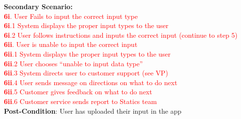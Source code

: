 	\textbf{Secondary Scenario:}\\
	\textcolor{red}{\textbf{6i}. User Fails to input the correct input type}\\
	\textcolor{red}{\hspace{1em} \textbf{6i}.1 System displays the proper input types to the user }\\
	\textcolor{red}{\hspace{1em} \textbf{6i}.2 User follows instructions and inputs the correct input (continue to step 5)}\\
\textcolor{red}{\textbf{6ii}. User is unable to input the correct input}\\
	\textcolor{red}{\hspace{1em} \textbf{6ii}.1 System displays the proper input types to the user}\\
	\textcolor{red}{\hspace{1em} \textbf{6ii}.2 User chooses “unable to input data type”}\\
	\textcolor{red}{\hspace{1em} \textbf{6ii}.3 System directs user to customer support (see VP)}\\
	\textcolor{red}{\hspace{1em} \textbf{6ii}.4 User sends message on directions on what to do next}\\
	\textcolor{red}{\hspace{1em} \textbf{6ii}.5 Customer gives feedback on what to do next}\\
	\textcolor{red}{\hspace{1em} \textbf{6ii}.6 Customer service sends report to Statics team}\\
	\textbf{Post-Condition}: User has uploaded their input in the app